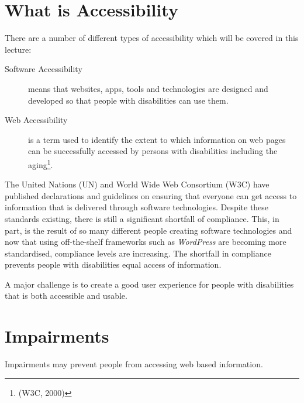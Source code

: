 
\section*{What is Accessibility}
There are a number of different types of accessibility which will be covered in this lecture:
\begin{description}
    \item[Software Accessibility] means that websites, apps, tools and technologies are designed and developed so that people with disabilities can use them.
    \item[Web Accessibility] is a term used to identify the extent to which information on web pages can be successfully accessed by persons with disabilities including the aging\footnote{(W3C, 2000)}.
\end{description}

The United Nations (UN) and World Wide Web Consortium (W3C) have published declarations and guidelines on ensuring that everyone can get access to information that is delivered through software technologies. Despite these standards existing, there is still a significant shortfall of compliance. This, in part, is the result of so many different people creating software technologies and now that using off-the-shelf frameworks such as \textit{WordPress} are becoming more standardised, compliance levels are increasing. The shortfall in compliance prevents people with disabilities equal access of information. 

A major challenge is to create a good user experience for people with disabilities that is both accessible and usable.

\section*{Impairments}
Impairments may prevent people from accessing web based information.



